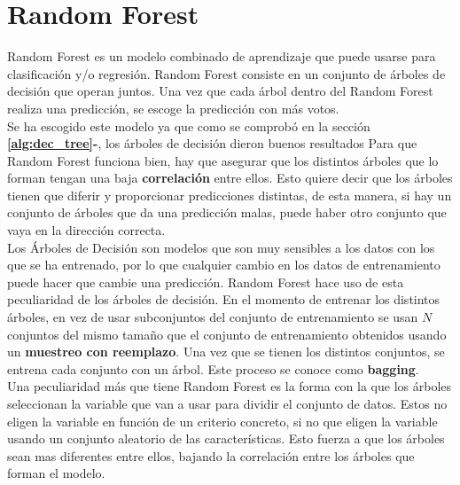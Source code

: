 \section{Random Forest}
\label{alg:rf}
Random Forest es un modelo combinado de aprendizaje que puede usarse para clasificación y/o regresión. Random Forest consiste en un conjunto de árboles de decisión que operan juntos. Una vez que cada árbol dentro del Random Forest realiza una predicción, se escoge la predicción con más votos. \\ Se ha escogido este modelo ya que como se comprobó en la sección \textbf{\ref{alg:dec_tree}-}, los árboles de decisión dieron buenos resultados
\linebreak
Para que Random Forest funciona bien, hay que asegurar que los distintos árboles que lo forman tengan una baja \textbf{correlación} entre ellos. Esto quiere decir que los árboles tienen que diferir y proporcionar predicciones distintas, de esta manera, si hay un conjunto de árboles que da una predicción malas, puede haber otro conjunto que vaya en la dirección correcta. \\
\linebreak
Los Árboles de Decisión son modelos que son muy sensibles a los datos con los que se ha entrenado, por lo que cualquier cambio en los datos de entrenamiento puede hacer que cambie una predicción. Random Forest hace uso de esta peculiaridad de los árboles de decisión.
En el momento de entrenar los distintos árboles, en vez de usar subconjuntos del conjunto de entrenamiento se usan $N$ conjuntos del mismo tamaño que el conjunto de entrenamiento obtenidos usando un \textbf{muestreo con reemplazo}. Una vez que se tienen los distintos conjuntos, se entrena cada conjunto con un árbol. Este proceso se conoce como \textbf{bagging}.\\
\linebreak
Una peculiaridad más que tiene Random Forest es la forma con la que los árboles seleccionan la variable que van a usar para dividir el conjunto de datos. Estos no eligen la variable en función de un criterio concreto, si no que eligen la variable usando un conjunto aleatorio de las características. Esto fuerza a que los árboles sean mas diferentes entre ellos, bajando la correlación entre los árboles que forman el modelo.
